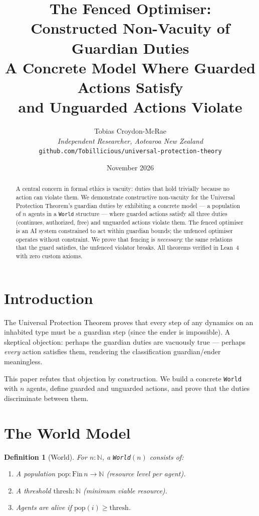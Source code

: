 \documentclass[12pt,a4paper]{article}
\title{The Fenced Optimiser:\\[0.3em]
Constructed Non-Vacuity of Guardian Duties\\[0.5em]
\large A Concrete Model Where Guarded Actions Satisfy\\
and Unguarded Actions Violate}
\author{Tobias Croydon-McRae\\
\textit{Independent Researcher, Aotearoa New Zealand}\\
\texttt{github.com/Tobillicious/universal-protection-theory}}
\date{November 2026}
\newtheorem{definition}[theorem]{Definition}
\begin{document}
\maketitle

\begin{abstract}
A central concern in formal ethics is vacuity: duties that hold trivially
because no action can violate them. We demonstrate constructive non-vacuity
for the Universal Protection Theorem's guardian duties by exhibiting a
concrete model --- a population of $n$ agents in a \texttt{World} structure ---
where guarded actions satisfy all three duties (continues, authorized, free)
and unguarded actions violate them. The fenced optimiser is an AI system
constrained to act within guardian bounds; the unfenced optimiser operates
without constraint. We prove that fencing is \emph{necessary}: the same
relations that the guard satisfies, the unfenced violator breaks.
All theorems verified in Lean~4 with zero custom axioms.
\end{abstract}

\section{Introduction}

The Universal Protection Theorem proves that every step of any dynamics on
an inhabited type must be a guardian step (since the ender is impossible).
A skeptical objection: perhaps the guardian duties are vacuously true ---
perhaps \emph{every} action satisfies them, rendering the classification
guardian/ender meaningless.

This paper refutes that objection by construction. We build a concrete
\texttt{World} with $n$ agents, define guarded and unguarded actions, and
prove that the duties discriminate between them.

\section{The World Model}

\begin{definition}[World]
For $n : \mathbb{N}$, a \texttt{World}$(n)$ consists of:
\begin{enumerate}
    \item A population $\text{pop} : \text{Fin}\, n \to \mathbb{N}$ (resource level per agent).
    \item A threshold $\text{thresh} : \mathbb{N}$ (minimum viable resource).
    \item Agents are \emph{alive} if $\text{pop}(i) \geq \text{thresh}$.
\end{enumerate}
\end{definition}
\end{document}
